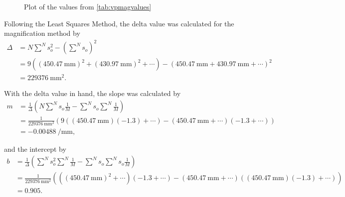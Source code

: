\begin{figure}[htbp!]
\centering
{}
\caption{Plot of the values from \cref{tab:vpmagvalues}}
\end{figure}

Following the Least Squares Method, the delta value was calculated for the magnification method by
\begin{align*}
    \Delta &= N \sum^N s_o^2 - \left(\sum^N s_o\right)^2 \\
    &= 9 \left(\left(\qty{450.47}{\milli\metre}\right)^2 + \left(\qty{430.97}{\milli\metre}\right)^2 + \cdots \right)  - \left(\qty{450.47}{\milli\metre} + \qty{430.97}{\milli\metre} + \cdots \right)^2 \\
    &= \qty{229376}{\milli\metre \squared}.
\end{align*}

With the delta value in hand, the slope was calculated by
\begin{align*}
    m &= \frac{1}{\Delta} \left(N \sum^N s_o \frac{1}{M} - \sum^N s_o \sum^N \frac{1}{M}\right) \\
    &= \frac{1}{\qty{229376}{\milli\metre \squared}} \left(9 \left(\left(\qty{450.47}{\milli\metre}\right)\left(-1.3\right) + \cdots\right) - \left(\qty{450.47}{\milli\metre} + \cdots\right)\left(-1.3 + \cdots\right)\right) \\
    &= -\qty{0.00488}{\per \milli\metre},
\end{align*}

and the intercept by
\begin{align*}
    b &= \frac{1}{\Delta} \left(\sum^N s_o^2 \sum^N \frac{1}{M} - \sum^N s_o \sum^N s_o \frac{1}{M}\right) \\
    &= \frac{1}{\qty{229376}{\milli\metre \squared}} \left(\left(\left(\qty{450.47}{\milli\metre}\right)^2 + \cdots\right)\left(-1.3 + \cdots\right) - \left(\qty{450.47}{\milli\metre} + \cdots\right)\left(\left(\qty{450.47}{\milli\metre}\right)\left(-1.3\right) + \cdots\right)\right) \\
    &= 0.905.
\end{align*}

